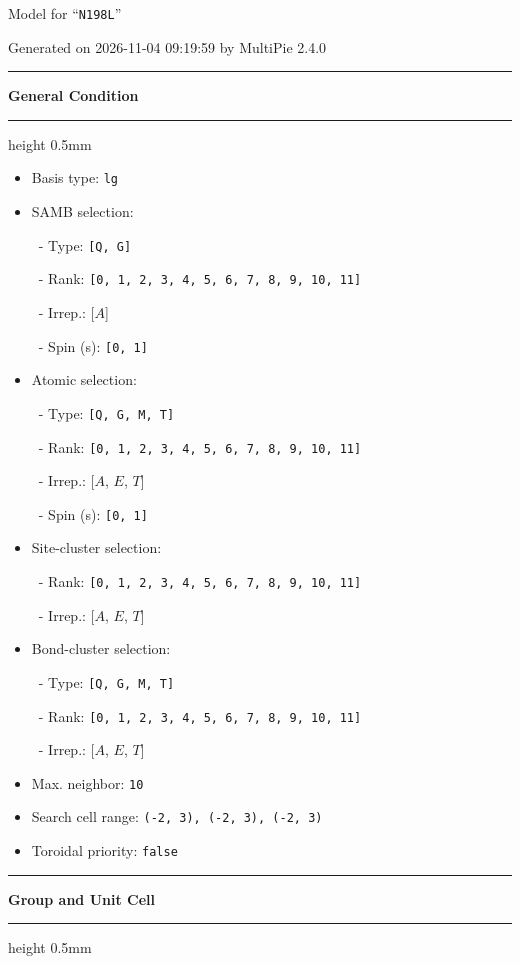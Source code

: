 \documentclass[fleqn,10pt,landscape]{jsarticle}
\begin{document}
\setcounter{MaxMatrixCols}{32}

\renewcommand{\tablename}{Table~}
\renewcommand{\figurename}{Figure~}
\setlength{\baselineskip}{16pt}
\setlength{\parindent}{0pt}
\setlength{\mathindent}{0pt}
\footnotesize
\begin{center}
\LARGE
Model for ``\texttt{N198L}''
\end{center}
\begin{flushright}
Generated on 2026-11-04 09:19:59 by MultiPie 2.4.0
\end{flushright}
\setlength{\baselineskip}{16pt}
\footnotesize
\vspace{5mm}
\noindent \rule[0.5mm]{5mm}{0.5mm}\hspace{3mm}\textbf{General Condition}\hspace{3mm}\leaders\hrule height 0.5mm\hfill\kern0pt
\vspace{3mm}

\begin{itemize}
\item Basis type: \texttt{lg}

\item SAMB selection:

\, - Type: \texttt{[Q, G]}

\, - Rank: \texttt{[0, 1, 2, 3, 4, 5, 6, 7, 8, 9, 10, 11]}

\, - Irrep.: [$A$]

\, - Spin (s): \texttt{[0, 1]}

\item Atomic selection:

\, - Type: \texttt{[Q, G, M, T]}

\, - Rank: \texttt{[0, 1, 2, 3, 4, 5, 6, 7, 8, 9, 10, 11]}

\, - Irrep.: [$A$, $E$, $T$]

\, - Spin (s): \texttt{[0, 1]}

\item Site-cluster selection:

\, - Rank: \texttt{[0, 1, 2, 3, 4, 5, 6, 7, 8, 9, 10, 11]}

\, - Irrep.: [$A$, $E$, $T$]

\item Bond-cluster selection:

\, - Type: \texttt{[Q, G, M, T]}

\, - Rank: \texttt{[0, 1, 2, 3, 4, 5, 6, 7, 8, 9, 10, 11]}

\, - Irrep.: [$A$, $E$, $T$]

\item Max. neighbor: \texttt{10}

\item Search cell range: \texttt{(-2, 3), (-2, 3), (-2, 3)}

\item Toroidal priority: \texttt{false}

\end{itemize}
\vspace{5mm}
\noindent \rule[0.5mm]{5mm}{0.5mm}\hspace{3mm}\textbf{Group and Unit Cell}\hspace{3mm}\leaders\hrule height 0.5mm\hfill\kern0pt
\vspace{3mm}
\end{document}
